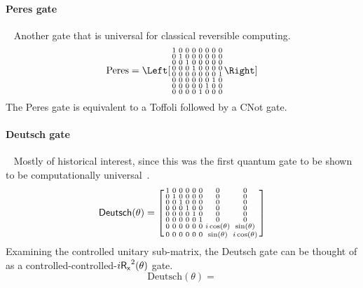 \paragraph{Peres gate}~\cite{Peres1985a, Maslov2003a} Another gate that is universal for classical reversible computing.
\[
\text{Peres} = 
\Left[ \begin{smallmatrix}
                1& 0& 0& 0& 0& 0& 0& 0 \\
                0& 1& 0& 0& 0& 0& 0& 0 \\
                0& 0& 1& 0& 0& 0& 0& 0 \\
                0& 0& 0& 1& 0& 0& 0& 0 \\
                0& 0& 0& 0& 0& 0& 0& 1 \\
                0& 0& 0& 0& 0& 0& 1& 0 \\
                0& 0& 0& 0& 0& 1& 0& 0 \\
                0& 0& 0& 0& 1& 0& 0& 0 
\end{smallmatrix} \Right]
\]
The Peres gate is equivalent to a Toffoli followed by a CNot gate.
$$

$$


\paragraph{Deutsch gate}~\cite{Deutsch1989a, Barenco1995a, Shi2018a}
 Mostly of historical interest, since this was the first quantum gate to be shown to be computationally universal~\cite{Deutsch1989a}. 
\[
\label{Deutsch}
{\sf{Deutsch}}(\theta) =
\begin{bsmallmatrix}
                1& 0& 0& 0& 0& 0& 0& 0 \\
                0& 1& 0& 0& 0& 0& 0& 0 \\
                0& 0& 1& 0& 0& 0& 0& 0 \\
                0& 0& 0& 1& 0& 0& 0& 0 \\
                0& 0& 0& 0& 1& 0& 0& 0 \\
                0& 0& 0& 0& 0& 1& 0& 0 \\
                0& 0& 0& 0& 0& 0& i \cos(\theta) & \sin(\theta) \\
                0& 0& 0& 0& 0& 0& \sin(\theta)& i \cos(\theta)
\end{bsmallmatrix}
\]
Examining the controlled unitary sub-matrix, the Deutsch gate can be thought of as a controlled-controlled-$i\Gate{R_x}^2(\theta)$ gate.
$$
\text{Deutsch}(\theta) = 

$$

